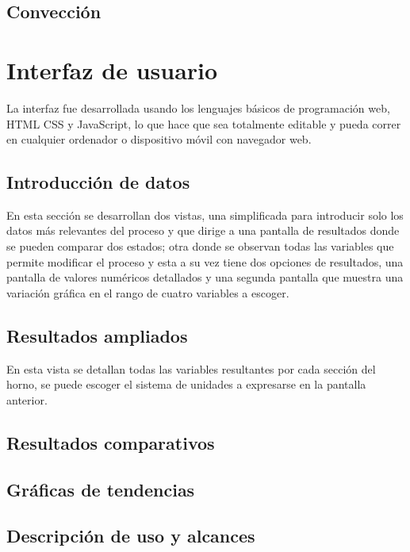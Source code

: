 \par 

\subsection{Convección}

\par 


\section{Interfaz de usuario}

\par La interfaz fue desarrollada usando los lenguajes básicos de programación web, HTML CSS y JavaScript, lo que hace que sea totalmente editable y pueda correr en cualquier ordenador o dispositivo móvil con navegador web.

\subsection{Introducción de datos}

\par En esta sección se desarrollan dos vistas, una simplificada para introducir solo los datos más relevantes del proceso y que dirige a una pantalla de resultados donde se pueden comparar dos estados; otra donde se observan todas las variables que permite modificar el proceso y esta a su vez tiene dos opciones de resultados, una pantalla de valores numéricos detallados y una segunda pantalla que muestra una variación gráfica en el rango de cuatro variables a escoger.  

\subsection{Resultados ampliados}

\par En esta vista se detallan todas las variables resultantes por cada sección del horno, se puede escoger el sistema de unidades a expresarse en la pantalla anterior.

\subsection{Resultados comparativos}
\subsection{Gráficas de tendencias}
\subsection{Descripción de uso y alcances}